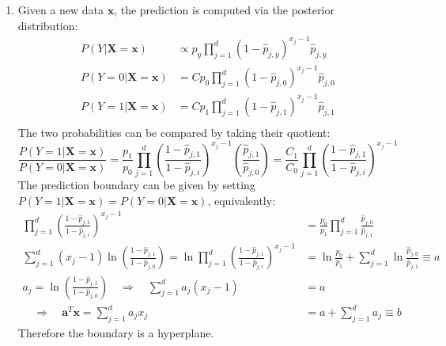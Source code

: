 \documentclass[a4paper, 10pt]{article}
\begin{document}
\begin{enumerate}[label=(\alph*)]
    \item Given a new data $\mathbf{x}$, the prediction is computed via the posterior distribution:
    \begin{equation}
        \begin{aligned}
            P(Y | \mathbf{X} = \mathbf{x}) &\propto p_y \prod_{j=1}^d \left(1 - \hat{p}_{j,y}\right)^{x_j - 1} \hat{p}_{j,y} \\ 
            P(Y = 0 | \mathbf{X} = \mathbf{x}) &= C p_0 \prod_{j=1}^d \left(1 - \hat{p}_{j,0}\right)^{x_j - 1} \hat{p}_{j,0} \\
            P(Y = 1 | \mathbf{X} = \mathbf{x}) &= C p_1 \prod_{j=1}^d \left(1 - \hat{p}_{j,1}\right)^{x_j - 1} \hat{p}_{j,1} \\
        \end{aligned}
    \end{equation}
    The two probabilities can be compared by taking their quotient:
    \begin{equation}
        \frac{P(Y=1|\mathbf{X}=\mathbf{x})}{P(Y=0|\mathbf{X}=\mathbf{x})} = \frac{p_1}{p_0} \prod_{j=1}^d \left(\frac{1 - \hat{p}_{j,1}}{1 - \hat{p}_{j,i}}\right)^{x_j - 1} \left(\frac{\hat{p}_{j,1}}{\hat{p}_{j,0}}\right) = \frac{C_1}{C_0} \prod_{j=1}^d \left(\frac{1 - \hat{p}_{j,1}}{1 - \hat{p}_{j,i}}\right)^{x_j - 1}
    \end{equation}
    The prediction boundary can be given by setting $P(Y=1|\mathbf{X}=\mathbf{x}) = P(Y=0|\mathbf{X}=\mathbf{x})$, equivalently:
    \begin{equation}
        \begin{aligned}
            \prod_{j=1}^d \left(\frac{1 - \hat{p}_{j,1}}{1 - \hat{p}_{j,i}}\right)^{x_j - 1} &= \frac{p_0}{p_1} \prod_{j=1}^d \frac{\hat{p}_{j,0}}{\hat{p}_{j,1}} \\
            \sum_{j=1}^d (x_j - 1) \ln \left(\frac{1 - \hat{p}_{j,1}}{1 - \hat{p}_{j,0}}\right) = \ln \prod_{j=1}^d \left(\frac{1 - \hat{p}_{j,1}}{1 - \hat{p}_{j,i}}\right)^{x_j - 1} &= \ln \frac{p_0}{p_1} + \sum_{j=1}^d \ln \frac{\hat{p}_{j,0}}{\hat{p}_{j,1}} \equiv a \\ 
            a_j = \ln \left(\frac{1 - \hat{p}_{j,1}}{1 - \hat{p}_{j,0}}\right) \quad \Longrightarrow \quad \sum_{j=1}^d a_j (x_j - 1) &= a \\
            \quad \Longrightarrow \quad \mathbf{a}^T \mathbf{x} = \sum_{j=1}^d a_j x_j &= a + \sum_{j=1}^d a_j \equiv b
        \end{aligned}
    \end{equation}
    Therefore the boundary is a hyperplane.


\end{enumerate}
\end{document}
